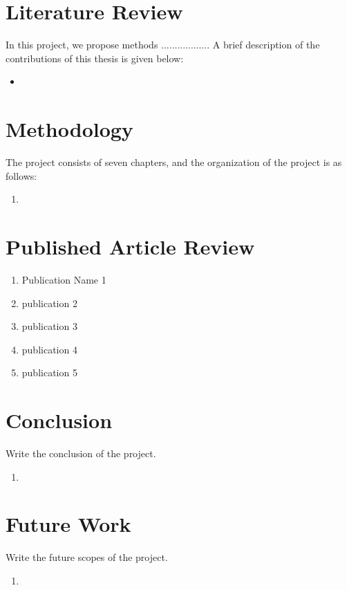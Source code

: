 \documentclass[12pt,a4paper,oneside]{report}
\begin{document}
	
	
	
	
	\section{Literature Review}
	In this project, we propose methods .................. A brief description of the contributions of this thesis is given below:
	\begin{itemize}
		\item
		
		
	\end{itemize}
	
	\newpage
	\section{Methodology}
	The project consists  of seven  chapters, and the organization of the project is as follows:
	\begin{enumerate}
		\item
		
	\end{enumerate}
	
	\newpage
	\section{Published Article Review}
	\begin{enumerate}
		\item Publication Name 1  
		\item publication 2
		\item publication 3
		\item publication 4
		\item publication 5
		
	\end{enumerate}
	
	\newpage
	\section{Conclusion}
	Write the conclusion of the project.
	\begin{enumerate}
		\item
	\end{enumerate}
	
	\newpage
	\section{Future Work}
	Write the future scopes of the project.
	\begin{enumerate}
		\item
		
	\end{enumerate}
	
	
	
\end{document}
